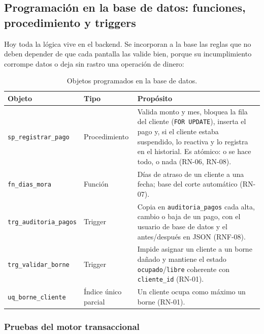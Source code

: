 \subsection{Programación en la base de datos: funciones, procedimiento y triggers}
\label{sec:ce02-programacion}

Hoy toda la lógica vive en el backend. Se incorporan a la base las reglas que no deben
depender de que cada pantalla las valide bien, porque su incumplimiento corrompe datos
o deja sin rastro una operación de dinero:

\begin{table}[htbp]
\centering
\caption{Objetos programados en la base de datos.}
\label{tab:ce02-objetos-bd}
\small
\begin{tabularx}{\textwidth}{L{3.6cm}L{2cm}X}
\toprule
\textbf{Objeto} & \textbf{Tipo} & \textbf{Propósito} \\
\midrule
\texttt{sp\_registrar\_pago} & Procedimiento & Valida monto y mes, bloquea la fila del cliente (\texttt{FOR UPDATE}), inserta el pago y, si el cliente estaba suspendido, lo reactiva y lo registra en el historial. Es atómico: o se hace todo, o nada (RN-06, RN-08). \\
\texttt{fn\_dias\_mora} & Función & Días de atraso de un cliente a una fecha; base del corte automático (RN-07). \\
\texttt{trg\_auditoria\_pagos} & Trigger & Copia en \texttt{auditoria\_pagos} cada alta, cambio o baja de un pago, con el usuario de base de datos y el antes/después en JSON (RNF-08). \\
\texttt{trg\_validar\_borne} & Trigger & Impide asignar un cliente a un borne dañado y mantiene el estado \texttt{ocupado}/\texttt{libre} coherente con \texttt{cliente\_id} (RN-01). \\
\texttt{uq\_borne\_cliente} & Índice único parcial & Un cliente ocupa como máximo un borne (RN-01). \\
\bottomrule
\end{tabularx}
\end{table}



\subsubsection*{Pruebas del motor transaccional}

